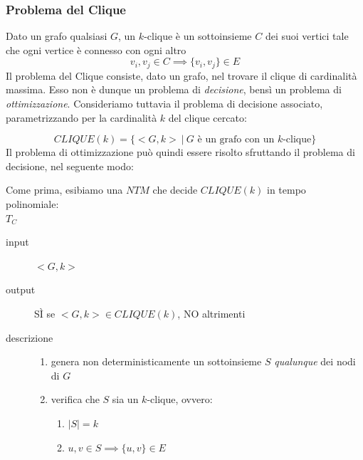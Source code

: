 \subsubsection{Problema del Clique}
Dato un grafo qualsiasi $G$, un $k$-clique è un sottoinsieme $C$ dei suoi vertici tale che ogni vertice è connesso con ogni altro
\[
	v_i, v_j \in C \implies \{v_i, v_j\} \in E
\]
Il problema del Clique consiste, dato un grafo, nel trovare il clique di cardinalità massima. Esso non è dunque un problema di \emph{decisione}, bensì un problema di \emph{ottimizzazione}. Consideriamo tuttavia il problema di decisione associato, parametrizzando per la cardinalità $k$ del clique cercato:

\[
	CLIQUE(k) = \{ <G, k> \ | \ G \text{ è un grafo con un } k\text{-clique} \}
\]
Il problema di ottimizzazione può quindi essere risolto sfruttando il problema di decisione, nel seguente modo:
\IncMargin{1em}
\begin{algorithm}

\BlankLine
{}
\end{algorithm}\DecMargin{1em}

\newpage

Come prima, esibiamo una $NTM$ che decide $CLIQUE(k)$ in tempo \\
polinomiale:
\\

$T_{C}$
\begin{description}
	\item[input] $<G, k>$
	\item[output] SÌ se $<G, k> \in CLIQUE(k)$, NO altrimenti
	\item[descrizione]
	\begin{enumerate}[label*=\arabic*.]
		\item genera non deterministicamente un sottoinsieme $S$ \emph{qualunque} dei nodi di $G$

		\item verifica che $S$ sia un $k$-clique, ovvero:
		\begin{enumerate}[label*=\arabic*.]
			\item $|S| = k$
			\item $u, v \in S \implies \{u, v\} \in E$
		\end{enumerate}
	\end{enumerate}
\end{description}


